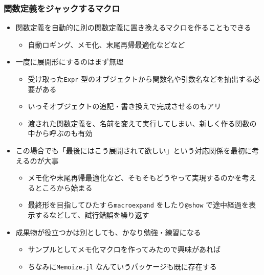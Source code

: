 \begin{frame}[containsverbatim]
\frametitle{関数定義をジャックするマクロ}
\begin{itemize}
  \item 関数定義を自動的に別の関数定義に置き換えるマクロを作ることもできる
  \begin{itemize}
    \item 自動ロギング、メモ化、末尾再帰最適化などなど
  \end{itemize}
  \item 一度に展開形にするのはまず無理
    \begin{itemize}
      \item 受け取った\verb|Expr| 型のオブジェクトから関数名や引数名などを抽出する必要がある
      \item いっそオブジェクトの追記・書き換えで完成させるのもアリ
      \item 渡された関数定義を、名前を変えて実行してしまい、新しく作る関数の中から呼ぶのも有効
    \end{itemize}
  \item この場合でも「最後にはこう展開されて欲しい」という対応関係を最初に考えるのが大事
    \begin{itemize}
      \item メモ化や末尾再帰最適化など、そもそもどうやって実現するのかを考えるところから始まる
      \item 最終形を目指してひたすら\verb|macroexpand| をしたり\verb|@show| で途中経過を表示するなどして、試行錯誤を繰り返す
    \end{itemize}
  \item 成果物が役立つかは別としても、かなり勉強・練習になる
    \begin{itemize}
      \item サンプルとしてメモ化マクロを作ってみたので興味があれば
      \item ちなみに\verb|Memoize.jl| なんていうパッケージも既に存在する
    \end{itemize}
\end{itemize}
\end{frame}

